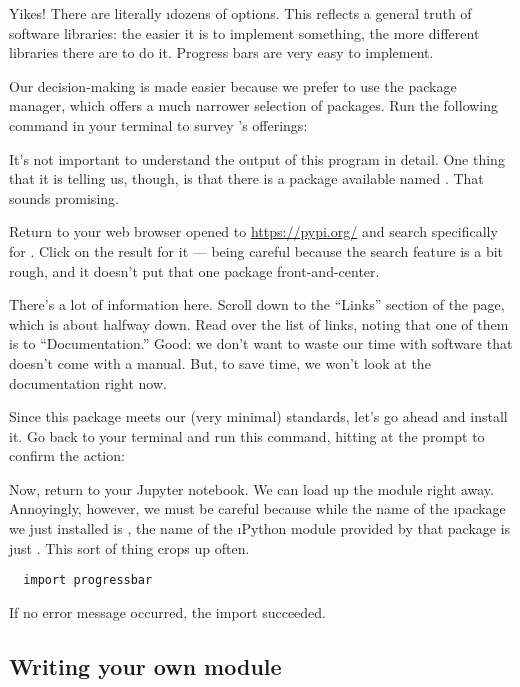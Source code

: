 \documentclass[letterpaper, 12pt, titlepage, twoside]{article}
\begin{document}
Yikes! There are literally \i{dozens} of options. This reflects a general
truth of software libraries: the easier it is to implement something, the more
different libraries there are to do it. Progress bars are very easy to
implement.

Our decision-making is made easier because we prefer to use the 
package manager, which offers a much narrower selection of packages. Run the
following command in your terminal to survey 's offerings:


It's not important to understand the output of this program in detail. One
thing that it is telling us, though, is that there is a package available
named . That sounds promising.

Return to your web browser opened to \url{https://pypi.org/} and search
specifically for . Click on the result for it --- being
careful because the search feature is a bit rough, and it doesn't put that one
package front-and-center.

There's a lot of information here. Scroll down to the ``Links'' section of the
page, which is about halfway down. Read over the list of links, noting that
one of them is to ``Documentation.'' Good: we don't want to waste our time
with software that doesn't come with a manual. But, to save time, we won't
look at the documentation right now.

Since this package meets our (very minimal) standards, let's go ahead and
install it. Go back to your terminal and run this command, hitting 
at the prompt to confirm the action:


Now, return to your Jupyter notebook. We can load up the module right away.
Annoyingly, however, we must be careful because while the name of the
\i{package} we just installed is , the name of the \i{Python
  module} provided by that package is just . This sort of thing
crops up often.

\begin{lstlisting}
  import progressbar
\end{lstlisting}

If no error message occurred, the import succeeded.

\subsection*{Writing your own module}
\end{document}
